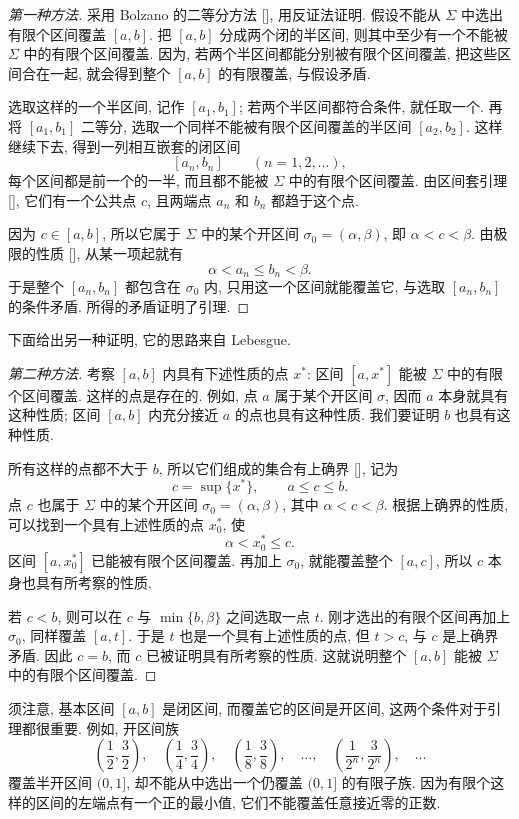 \begin{proof}[第一种方法]
采用 Bolzano 的二等分方法 [], 用反证法证明.
假设不能从 $\Sigma$ 中选出有限个区间覆盖 $[a,b]$.
把 $[a,b]$ 分成两个闭的半区间, 则其中至少有一个不能被 $\Sigma$ 中的有限个区间覆盖.
因为, 若两个半区间都能分别被有限个区间覆盖,
把这些区间合在一起, 就会得到整个 $[a,b]$ 的有限覆盖, 与假设矛盾.

选取这样的一个半区间, 记作 $[a_1,b_1]$;
若两个半区间都符合条件, 就任取一个.
再将 $[a_1,b_1]$ 二等分, 选取一个同样不能被有限个区间覆盖的半区间 $[a_2,b_2]$.
这样继续下去, 得到一列相互嵌套的闭区间
$$
[a_n,b_n]\qquad(n=1,2,\ldots),
$$
每个区间都是前一个的一半, 而且都不能被 $\Sigma$ 中的有限个区间覆盖.
由区间套引理 [], 它们有一个公共点 $c$,
且两端点 $a_n$ 和 $b_n$ 都趋于这个点.

因为 $c\in[a,b]$, 所以它属于 $\Sigma$ 中的某个开区间
$\sigma_0=(\alpha,\beta)$, 即 $\alpha<c<\beta$.
由极限的性质 [], 从某一项起就有
$$
\alpha<a_n\leq b_n<\beta.
$$
于是整个 $[a_n,b_n]$ 都包含在 $\sigma_0$ 内,
只用这一个区间就能覆盖它, 与选取 $[a_n,b_n]$ 的条件矛盾.
所得的矛盾证明了引理.
\end{proof}

下面给出另一种证明, 它的思路来自 Lebesgue.
\begin{proof}[第二种方法]
考察 $[a,b]$ 内具有下述性质的点 $x^*$:
区间 $[a,x^*]$ 能被 $\Sigma$ 中的有限个区间覆盖.
这样的点是存在的. 例如, 点 $a$ 属于某个开区间 $\sigma$,
因而 $a$ 本身就具有这种性质; 区间 $[a,b]$ 内充分接近 $a$ 的点也具有这种性质.
我们要证明 $b$ 也具有这种性质.

所有这样的点都不大于 $b$, 所以它们组成的集合有上确界 [], 记为
$$
c=\sup\{x^*\},\qquad a\leq c\leq b.
$$
点 $c$ 也属于 $\Sigma$ 中的某个开区间 $\sigma_0=(\alpha,\beta)$,
其中 $\alpha<c<\beta$.
根据上确界的性质, 可以找到一个具有上述性质的点 $x_0^*$, 使
$$
\alpha<x_0^*\leq c.
$$
区间 $[a,x_0^*]$ 已能被有限个区间覆盖.
再加上 $\sigma_0$, 就能覆盖整个 $[a,c]$,
所以 $c$ 本身也具有所考察的性质.

若 $c<b$, 则可以在 $c$ 与 $\min\{b,\beta\}$ 之间选取一点 $t$.
刚才选出的有限个区间再加上 $\sigma_0$, 同样覆盖 $[a,t]$.
于是 $t$ 也是一个具有上述性质的点, 但 $t>c$, 与 $c$ 是上确界矛盾.
因此 $c=b$, 而 $c$ 已被证明具有所考察的性质.
这就说明整个 $[a,b]$ 能被 $\Sigma$ 中的有限个区间覆盖.
\end{proof}

须注意, 基本区间 $[a,b]$ 是闭区间, 而覆盖它的区间是开区间,
这两个条件对于引理都很重要.
例如, 开区间族
$$
\left(\frac12,\frac32\right),\quad
\left(\frac14,\frac34\right),\quad
\left(\frac18,\frac38\right),\quad\ldots,\quad
\left(\frac1{2^n},\frac3{2^n}\right),\quad\ldots
$$
覆盖半开区间 $(0,1]$, 却不能从中选出一个仍覆盖 $(0,1]$ 的有限子族.
因为有限个这样的区间的左端点有一个正的最小值,
它们不能覆盖任意接近零的正数.


